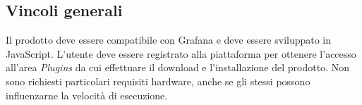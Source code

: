 \subsection{Vincoli generali}
Il prodotto deve essere compatibile con Grafana e deve essere sviluppato in JavaScript. L'utente deve essere registrato alla piattaforma per ottenere l'accesso all'area \emph{Plugins} da cui effettuare il download e l'installazione del prodotto. Non sono richiesti particolari requisiti hardware, anche se gli stessi possono influenzarne la velocità di esecuzione.

\pagebreak
